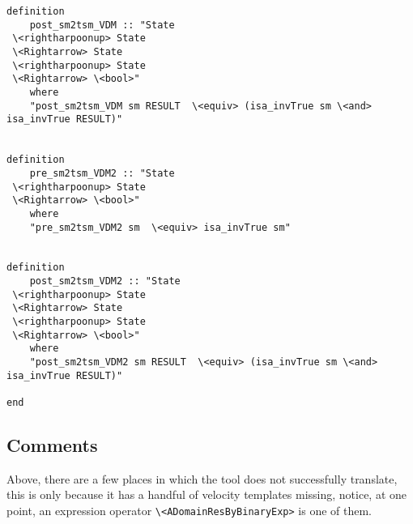 \begin{lstlisting}[language=Isabelle]
definition
	post_sm2tsm_VDM :: "State
 \<rightharpoonup> State
 \<Rightarrow> State
 \<rightharpoonup> State
 \<Rightarrow> \<bool>"
    where
    "post_sm2tsm_VDM sm RESULT  \<equiv> (isa_invTrue sm \<and> isa_invTrue RESULT)"


definition
	pre_sm2tsm_VDM2 :: "State
 \<rightharpoonup> State
 \<Rightarrow> \<bool>"
    where
    "pre_sm2tsm_VDM2 sm  \<equiv> isa_invTrue sm"


definition
	post_sm2tsm_VDM2 :: "State
 \<rightharpoonup> State
 \<Rightarrow> State
 \<rightharpoonup> State
 \<Rightarrow> \<bool>"
    where
    "post_sm2tsm_VDM2 sm RESULT  \<equiv> (isa_invTrue sm \<and> isa_invTrue RESULT)"

end
\end{lstlisting}

\subsection{Comments}
Above, there are a few places in which the tool does not successfully translate, this is only because it has a handful of velocity templates missing, notice, at one point, an expression operator \lstinline[language=Isabelle]{\<ADomainResByBinaryExp>} is one of them.

